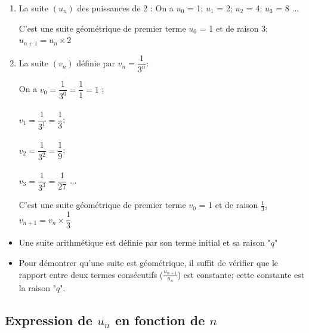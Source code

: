 \documentclass[12pt,a4paper]{article}
\begin{document}
\begin{myex}
	\begin{enumerate}
		\item La suite $(u_n)$ des puissances de 2 :
			On a $u_0$ = 1; $u_1$ = 2; $u_2$ = 4; $u_3$ = 8 ...
		
		C'est une suite géométrique de premier terme $u_0$ = 1 et de raison 3; \\ $u_{n+1} = u_n \times 2 $
		
		\item La suite $(v_n)$ définie par $v_n = \dfrac{1}{3^n}$: 
		
		\begin{multicols}{2}
			On a $v_0 = \dfrac{1}{3^0}  = \dfrac{1}{1} = 1$ ; \\ \\
			$v_1 = \dfrac{1}{3^1} = \dfrac{1}{3}$; \\ \\
			$v_2 = \dfrac{1}{3^2} = \dfrac{1}{9}$; \\ \\
			$v_3 = \dfrac{1}{3^3} = \dfrac{1}{27}$ ...
		\end{multicols}
		
		C'est une suite géométrique de premier terme $v_0$ = 1 et de raison $\frac{1}{3}$,\\ $v_{n+1} = v_n \times \dfrac{1}{3} $
	\end{enumerate}
\end{myex}	

\begin{myrem}
	\begin{itemize}
		\item Une suite arithmétique est définie par son terme initial et sa raison "$q$"
		
		\item Pour démontrer qu'une suite est géométrique, il suffit de vérifier que le rapport entre deux termes consécutifs ($\frac{u_{n+1}}{u_n}$) est constante; cette constante est la raison "$q$".
	\end{itemize}
\end{myrem}

\subsection{Expression de $u_n$ en fonction de $n$}
\end{document}
